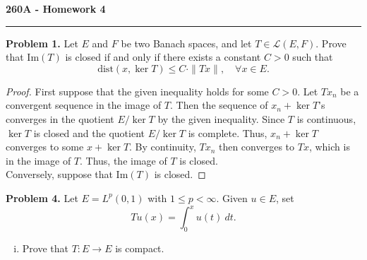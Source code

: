 \documentclass[11pt,letterpaper]{report}
\newcommand{\mcal}[1]{\mathcal{#1}}
\newcommand{\img}{\text{Im}}
\newcommand{\dist}{\text{dist}}
\begin{document}
\begin{center}
{\bf \Large 260A - Homework 4} %
\vspace{0.2cm}
\hrule
\end{center}

\noindent\textbf{Problem 1. }Let $E$ and $F$ be two Banach spaces, and let $T\in \mcal{L}(E,F)$. Prove that $\img(T)$ is closed if and only if there exists a constant $C>0$ such that
\[
\dist(x, \ker T)\leq C\cdot \|Tx\|,\quad \forall x\in E.
\]
\begin{proof}
	First suppose that the given inequality holds for some $C>0$. Let $Tx_n$ be a convergent sequence in the image of $T$. Then the sequence of $x_n+\ker T$'s converges in the quotient $E/\ker T$ by the given inequality. Since $T$ is continuous, $\ker T$ is closed and the quotient $E/\ker T$ is complete. Thus, $x_n+\ker T$ converges to some $x+\ker T$. By continuity, $Tx_n$ then converges to $Tx$, which is in the image of $T$. Thus, the image of $T$ is closed.\\

	\noindent Conversely, suppose that $\img(T)$ is closed. 
\end{proof}

\noindent\textbf{Problem 4. }
Let $E = L^p(0,1)$ with $1\leq p<\infty$. Given $u\in E$, set
\[
Tu(x) = \int_0^xu(t)\ dt.
\]
\begin{enumerate}[(i)]
	\item Prove that $T:E\to E$ is compact.
\end{enumerate}
\end{document}
